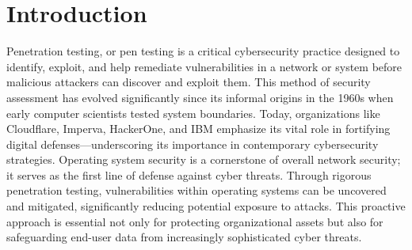 \documentclass[manuscript,acmsmall,anonymous,review,screen,nonacm=true, authorversion=true]{acmart}
\begin{document}




\maketitle

\section{Introduction}
Penetration testing, or pen testing is a critical cybersecurity practice designed to identify, exploit, and help remediate vulnerabilities in a network or system before malicious attackers can discover and exploit them. This method of security assessment has evolved significantly since its informal origins in the 1960s when early computer scientists tested system boundaries. Today, organizations like Cloudflare, Imperva, HackerOne, and IBM emphasize its vital role in fortifying digital defenses—underscoring its importance in contemporary cybersecurity strategies. Operating system security is a cornerstone of overall network security; it serves as the first line of defense against cyber threats. Through rigorous penetration testing, vulnerabilities within operating systems can be uncovered and mitigated, significantly reducing potential exposure to attacks. This proactive approach is essential not only for protecting organizational assets but also for safeguarding end-user data from increasingly sophisticated cyber threats.
\end{document}
